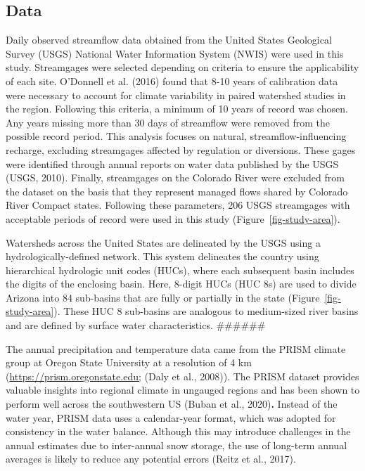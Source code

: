 \documentclass[
]{agujournal2019}
\begin{document}
\subsection{Data}\label{sec-data}

Daily observed streamflow data obtained from the United States
Geological Survey (USGS) National Water Information System (NWIS) were
used in this study. Streamgages were selected depending on criteria to
ensure the applicability of each site. O'Donnell et al. (2016) found
that 8-10 years of calibration data were necessary to account for
climate variability in paired watershed studies in the region. Following
this criteria, a minimum of 10 years of record was chosen. Any years
missing more than 30 days of streamflow were removed from the possible
record period. This analysis focuses on natural, streamflow-influencing
recharge, excluding streamgages affected by regulation or diversions.
These gages were identified through annual reports on water data
published by the USGS (USGS, 2010). Finally, streamgages on the Colorado
River were excluded from the dataset on the basis that they represent
managed flows shared by Colorado River Compact states. Following these
parameters, 206 USGS streamgages with acceptable periods of record were
used in this study (Figure~\ref{fig-study-area}).

Watersheds across the United States are delineated by the USGS using a
hydrologically-defined network. This system delineates the country using
hierarchical hydrologic unit codes (HUCs), where each subsequent basin
includes the digits of the enclosing basin. Here, 8-digit HUCs (HUC 8s)
are used to divide Arizona into 84 sub-basins that are fully or
partially in the state (Figure~\ref{fig-study-area}). These HUC 8
sub-basins are analogous to medium-sized river basins and are defined by
surface water characteristics. \#\#\#\#\#\#

The annual precipitation and temperature data came from the PRISM
climate group at Oregon State University at a resolution of 4 km
(\url{https://prism.oregonstate.edu;} (Daly et al., 2008)). The PRISM
dataset provides valuable insights into regional climate in ungauged
regions and has been shown to perform well across the southwestern US
(Buban et al., 2020)\textbf{.} Instead of the water year, PRISM data
uses a calendar-year format, which was adopted for consistency in the
water balance. Although this may introduce challenges in the annual
estimates due to inter-annual snow storage, the use of long-term annual
averages is likely to reduce any potential errors (Reitz et al., 2017).
\end{document}
